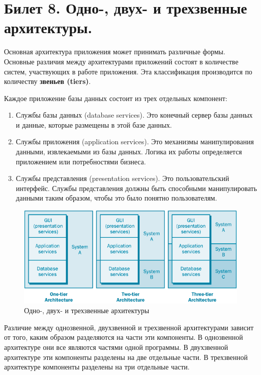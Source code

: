 \newpage
\section {Билет 8. Одно-, двух- и трехзвенные архитектуры.}

Основная архитектура приложения может принимать различные формы. Основные различия между архитектурами приложений состоят в количестве систем, участвующих в работе приложения. Эта классификация производится по количеству \textbf{звеньев (tiers)}.

Каждое приложение базы данных состоит из трех отдельных компонент:
\begin{enumerate}
	\item[\textbullet] Службы базы данных (database services). Это конечный сервер базы данных и данные, которые размещены в этой базе данных.
	\item[\textbullet] Службы приложения (application services). Это механизмы манипулирования данными, извлекаемыми из базы данных. Логика их работы определяется приложением или потребностями бизнеса.
	\item[\textbullet] Службы представления (presentation services). Это пользовательский интерфейс. Службы представления должны быть способными манипулировать данными таким образом, чтобы это было понятно пользователям.
\end{enumerate}

\begin{figure}[h]
	\centering
	\includegraphics[scale=0.75]{8/08_01.png}
	\caption{Одно-, двух- и трехзвенные архитектуры}
	\label{fig:my_label5}
\end{figure}

Различие между однозвенной, двухзвенной и трехзвенной архитектурами зависит от того, каким образом разделяются на части эти компоненты. В однозвенной архитектуре они все являются частями одной программы. В двухзвенной архитектуре эти компоненты разделены на две отдельные части. В трехзвенной архитектуре компоненты разделены на три отдельные части.

